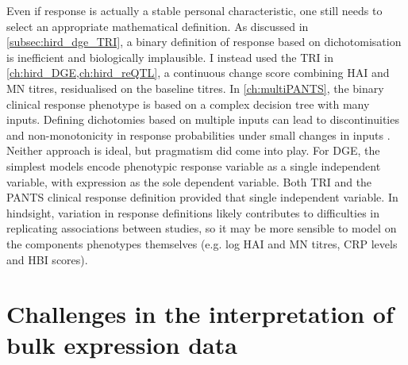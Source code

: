 Even if response is actually a stable personal characteristic, one still needs to select an appropriate mathematical definition.
As discussed in \cref{subsec:hird_dge_TRI}, a binary definition of response based on dichotomisation is inefficient and biologically implausible.
I instead used the \gls{TRI} in \cref{ch:hird_DGE,ch:hird_reQTL}, a continuous change score combining \gls{HAI} and \gls{MN} titres, residualised on the baseline titres.
In \cref{ch:multiPANTS}, the binary clinical response phenotype is based on a complex decision tree with many inputs.
Defining dichotomies based on multiple inputs can lead to discontinuities and non-monotonicity in response probabilities under small changes in inputs \autocite{senn2005DichotomaniaObsessiveCompulsive}.
Neither approach is ideal, but pragmatism did come into play.
For \gls{DGE}, the simplest models encode phenotypic response variable as a single independent variable, with expression as the sole dependent variable.
Both \gls{TRI} and the \gls{PANTS} clinical response definition provided that single independent variable.
In hindsight, variation in response definitions likely contributes to difficulties in replicating associations between studies,
so it may be more sensible to model on the components phenotypes themselves (e.g. log \gls{HAI} and \gls{MN} titres, \gls{CRP} levels and \gls{HBI} scores).


\section{Challenges in the interpretation of bulk expression data}

